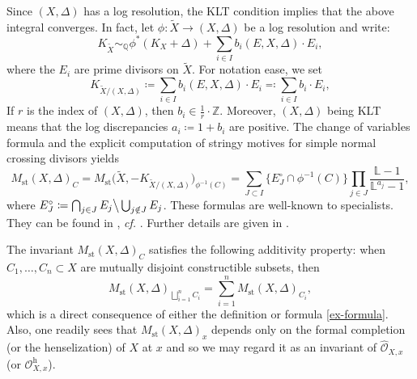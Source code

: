 \documentclass[12pt]{amsart}
\theoremstyle{plain}   %
\theoremstyle{definition}    %
\theoremstyle{remark}    %
\numberwithin{equation}{theorem}
\DeclareMathOperator{\st}{\mathrm{st}}
\newcommand{\sO}{\mathcal{O}}
\newcommand{\bL}{\mathbb{L}}
\newcommand{\bQ}{\mathbb{Q}}
\newcommand{\bZ}{\mathbb{Z}}
\newcommand{\cf}{{\itshape cf.} }
\begin{document}
\begin{remark} \label{rem.StringyMotivesLogResolution}
Since $(X,\Delta)$ has a log resolution, the KLT condition implies that the above integral converges. In fact, let $\phi\colon \tilde{X}\to (X,\Delta)$ be a log resolution and write:
\[
K_{\tilde{X}} \sim_{\bQ} \phi^*(K_X + \Delta) + \sum_{i\in I} b_i(E,X,\Delta) \cdot E_i,
\]
where the $E_i$ are prime divisors on $\tilde{X}$. For notation ease, we set
\[
K_{\tilde{X}/(X,\Delta)} \coloneqq \sum_{i\in I} b_i(E,X,\Delta) \cdot E_i \eqqcolon \sum_{i\in I} b_i \cdot E_i,
\]
If $r$ is the index of $(X,\Delta)$, then $b_i \in \frac{1}{r} \cdot \bZ$. Moreover, $(X,\Delta)$ being KLT means that the log discrepancies $a_i \coloneqq 1+b_i$ are positive. The change of variables formula and the explicit computation of stringy motives for simple normal crossing divisors yields
\begin{equation}\label{ex-formula}
M_{\st}(X,\Delta)_C=M_{\st}\Big(\tilde{X}, -K_{\tilde{X}/(X,\Delta)}\Big)_{\phi^{-1}(C)} = \sum_{J \subset I} \{E_J^{\circ}\cap \phi^{-1}(C)\} \prod_{j\in J} \frac{\bL - 1}{\bL^{a_j}-1},
\end{equation}
where $ E^{\circ}_J \coloneqq \bigcap_{j\in J} E_j \big\backslash \bigcup_{j\notin J} E_j$.
These formulas are well-known to specialists. They can be found in \cite[Proposition 8.4]{YasudaToward}, \cf \cite[Proposition 3.4.4 and Theorem 4.1.2]{ChambertLoirNicaiseSebag}. Further details are given in \cite{YasudaBook}.

The invariant $M_{\st}(X,\Delta)_C$ satisfies the following additivity property: when $C_1,\dots,C_n\subset X$ are mutually disjoint constructible subsets, then 
\begin{equation}\label{additive}
M_{\st}(X,\Delta)_{\bigsqcup _{i=1}^n C_i}=\sum_{i=1}^n M_{\st}(X,\Delta)_{C_i},
\end{equation}
which is a direct consequence of either the definition or formula \autoref{ex-formula}.
Also, one readily sees that $M_{\st}(X,\Delta)_x$ depends only on the formal completion (or the henselization) of $X$ at $x$ and so we may regard it as an invariant of $\hat{\sO}_{X,x}$ (or $\sO_{X,x}^{\mathrm{h}}$). 
\end{remark}
\end{document}
